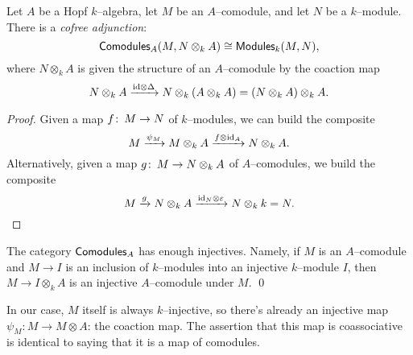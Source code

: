 \begin{lemma}
Let $A$ be a Hopf $k$--algebra, let $M$ be an $A$--comodule, and let $N$ be a $k$--module.  There is a \textit{cofree adjunction}: \[\mathsf{Comodules}_A(M, N \otimes_k A) \cong \mathsf{Modules}_k(M, N),\] where $N \otimes_k A$ is given the structure of an $A$--comodule by the coaction map \[N \otimes_k A \xrightarrow{\mathrm{id} \otimes \Delta} N \otimes_k (A \otimes_k A) = (N \otimes_k A) \otimes_k A.\]
\end{lemma}
\begin{proof}
Given a map $f\colon\thinspace M \to N$ of $k$--modules, we can build the composite \[M \xrightarrow{\psi_M} M \otimes_k A \xrightarrow{f \otimes \mathrm{id}_A} N \otimes_k A.\]  Alternatively, given a map $g\colon\thinspace M \to N \otimes_k A$ of $A$--comodules, we build the composite \[M \xrightarrow{g} N \otimes_k A \xrightarrow{\mathrm{id}_N \otimes \varepsilon} N \otimes_k k = N. \qedhere\]
\end{proof}

\begin{corollary}
The category $\mathsf{Comodules}_A$ has enough injectives.  Namely, if $M$ is an $A$--comodule and $M \to I$ is an inclusion of $k$--modules into an injective $k$--module $I$, then $M \to I \otimes_k A$ is an injective $A$--comodule under $M$. \qed
\end{corollary}
\begin{remark}
In our case, $M$ itself is always $k$--injective, so there's already an injective map $\psi_M: M \to M \otimes A$: the coaction map.  The assertion that this map is coassociative is identical to saying that it is a map of comodules.
\end{remark}

